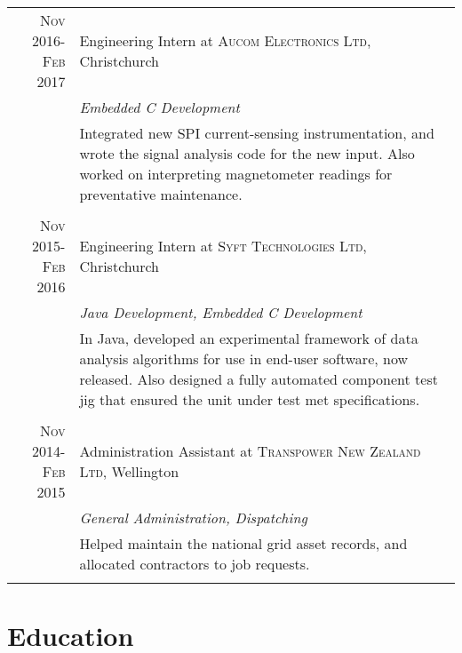 \documentclass[a4paper,10pt]{article} %
\begin{document}
\begin{tabular}{r|p{11cm}}

\textsc{Nov 2016-Feb 2017} & Engineering Intern at \textsc{Aucom Electronics Ltd}, Christchurch \\
& \emph{Embedded C Development}\\
& \footnotesize{Integrated new SPI current-sensing instrumentation, and wrote the signal analysis code for the new input. Also worked on interpreting magnetometer readings for preventative maintenance. } \\
\multicolumn{2}{c}{} \\


\textsc{Nov 2015-Feb 2016} & Engineering Intern at \textsc{Syft Technologies Ltd}, Christchurch \\
& \emph{Java Development, Embedded C Development}\\
& \footnotesize{In Java, developed an experimental framework of data analysis algorithms for use in end-user software, now released. Also designed a fully automated component test jig that ensured the unit under test met specifications. } \\
\multicolumn{2}{c}{} \\


\textsc{Nov 2014-Feb 2015} & Administration Assistant at \textsc{Transpower New Zealand Ltd}, Wellington \\
& \emph{General Administration, Dispatching}\\
& \footnotesize{Helped maintain the national grid asset records, and allocated contractors to job requests. } \\
\multicolumn{2}{c}{} \\



\end{tabular}


\section{Education}
\end{document}
